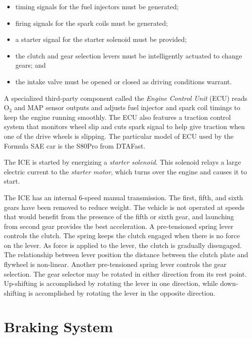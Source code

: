 \documentclass[english]{report}
\begin{document}
\begin{itemize}
\item timing signals for the fuel injectors must be generated;
\item firing signals for the spark coils must be generated;  
\item a starter signal for the starter solenoid must be provided;
\item the clutch and gear selection levers must be intelligently actuated to change gears; and
\item the intake valve must be opened or closed as driving conditions warrant.
\end{itemize}

A specialized third-party component called the \emph{Engine Control Unit} (ECU) reads O$_{2}$
and MAP sensor outputs and adjusts fuel injector and spark coil timings to keep the engine running 
smoothly. The ECU also features a traction control system that monitors wheel slip and cuts spark 
signal to help give traction when one of the drive wheels is slipping. The particular model of
ECU used by the Formula SAE car is the S80Pro from DTAFast\cite{s60pro}.

The ICE is started by energizing a \emph{starter solenoid}. This solenoid relays a large electric current 
to the \emph{starter motor}, which turns over the engine and causes it to start. 

The ICE has an internal 6-speed manual transmission. The first, fifth, and sixth gears have been 
removed to reduce weight. The vehicle is not operated at speeds that would benefit from the presence 
of the fifth or sixth gear, and launching from second gear provides the best acceleration. A pre-tensioned 
spring lever controls the clutch. The spring keeps the clutch engaged when there is no force on the lever.
As force is applied to the lever, the clutch is gradually disengaged. The relationship between
lever position the distance between the clutch plate and flywheel is non-linear. Another
pre-tensioned spring lever controls the gear selection. The gear selector may be rotated in either 
direction from its rest point. Up-shifting is accomplished by rotating the lever in one direction, 
while down-shifting is accomplished by rotating the lever in the opposite direction. 

\section{Braking System}
\end{document}
